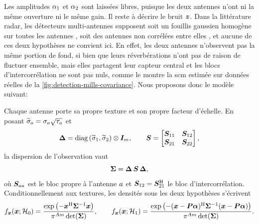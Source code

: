 Les amplitudes $\alpha_1$ et $\alpha_2$ sont laissées libres, puisque les deux antennes n'ont ni la même ouverture ni le même gain. Il reste à décrire le bruit $\boldsymbol{z}$. Dans la littérature radar, les détecteurs multi-antennes supposent soit un fouillis gaussien homogène sur toutes les antennes , soit des antennes non corrélées entre elles \cite{Chong201003}, et aucune de ces deux hypothèses ne convient ici. En effet, les deux antennes n'observent pas la même portion de fond, si bien que leurs réverbérations n'ont pas de raison de fluctuer ensemble, mais elles partagent leur capteur central et les blocs d'intercorrélation ne sont pas nuls, comme le montre la scm estimée sur données réelles de la \cref{fig:detection-mills-covariance}. Nous proposons donc le modèle suivant:

\begin{definition}
\label{def:detection-mills-multitexture}
  Chaque antenne porte sa propre texture et son propre facteur d'échelle. En posant $\widetilde{\sigma}_a = \sigma_a\sqrt{\tau_a}$ et
  \begin{equation}
    \boldsymbol{\Delta} = \operatorname{\operatorname{diag}}\left(\widetilde{\sigma}_1,\widetilde{\sigma}_2\right)\otimes\boldsymbol{I}_{m},
    \qquad
    \boldsymbol{S} = \begin{bmatrix}\boldsymbol{S}_{11} & \boldsymbol{S}_{12}\\\boldsymbol{S}_{21} & \boldsymbol{S}_{22}\end{bmatrix},
    \label{eq:detection-mills-scalemat}
  \end{equation}
  la dispersion de l'observation vaut
  \begin{equation}
    \boldsymbol{\Sigma} = \boldsymbol{\Delta}\,\boldsymbol{S}\,\boldsymbol{\Delta},
    \label{eq:detection-mills-cov}
  \end{equation}
  où $\boldsymbol{S}_{aa}$ est le bloc propre à l'antenne $a$ et $\boldsymbol{S}_{12}=\boldsymbol{S}_{21}^{\mathrm{H}}$ le bloc d'intercorrélation. Conditionnellement aux textures, les densités sous les deux hypothèses s'écrivent
  \begin{equation}
    f_{\boldsymbol{x}}(\boldsymbol{x};\mathcal{H}_0) = \frac{\exp\left(-\boldsymbol{x}^{\mathrm{H}} {\boldsymbol{\Sigma}}^{-1} \boldsymbol{x}\right)}{\pi^{Am}\operatorname{\operatorname{det}}(\boldsymbol{\Sigma})},
    \qquad
    f_{\boldsymbol{x}}(\boldsymbol{x};\mathcal{H}_1) = \frac{\exp\left(-(\boldsymbol{x}-\boldsymbol{P}\boldsymbol{\alpha})^{\mathrm{H}}{\boldsymbol{\Sigma}}^{-1}(\boldsymbol{x}-\boldsymbol{P}\boldsymbol{\alpha})\right)}{\pi^{Am}\operatorname{\operatorname{det}}(\boldsymbol{\Sigma})}.
    \label{eq:detection-mills-pdf}
  \end{equation}
\end{definition}

